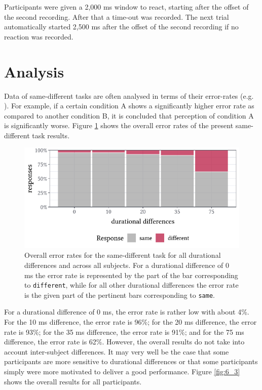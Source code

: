 Participants were given a 2,000 ms window to react, starting after the offset of the second recording. After that a time-out was recorded. The next trial automatically started 2,500 ms after the offset of the second recording if no reaction was recorded.

\section{Analysis}\label{section06_2}

Data of same-different tasks are often analysed in terms of their error-rates (e.g. \cite{Belke2002, Norris2008errorrates, Lupker2018}). For example, if a certain condition A shows a significantly higher error rate as compared to another condition B, it is concluded that perception of condition A is significantly worse. Figure \ref{fig:6_2} shows the overall error rates of the present same-different task results.

\begin{figure}
    \centering
    \includegraphics[]{figures/fig6.2.pdf}
    \caption{Overall error rates for the same-different task for all durational differences and across all subjects. For a durational difference of 0 ms the error rate is represented by the part of the bar corresponding to \texttt{different}, while for all other durational differences the error rate is the given part of the pertinent bars corresponding to \texttt{same}.}
    \label{fig:6_2}
\end{figure}

For a durational difference of 0 ms, the error rate is rather low with about 4\%. For the 10 ms difference, the error rate is 96\%; for the 20 ms difference, the error rate is 93\%; for the 35 ms difference, the error rate is 91\%; and for the 75 ms difference, the error rate is 62\%. However, the overall results do not take into account inter-subject differences. It may very well be the case that some participants are more sensitive to durational differences or that some participants simply were more motivated to deliver a good performance. Figure \ref{fig:6_3} shows the overall results for all participants. 

